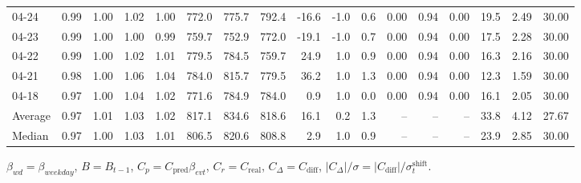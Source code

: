 \begin{threeparttable}
{\begin{tabular}{lrrrrrrrrrrrrrrrr}
  04-24 &         0.99 &           1.00 &          1.02 &          1.00 & 772.0 &  775.7 & 792.4 &      -16.6 &                     -1.0 &                 0.6 &       0.00 &      0.94 &           0.00 &             19.5 &            2.49 &                  30.00 \\
  04-23 &         0.99 &           1.00 &          1.00 &          0.99 & 759.7 &  752.9 & 772.0 &      -19.1 &                     -1.0 &                 0.7 &       0.00 &      0.94 &           0.00 &             17.5 &            2.28 &                  30.00 \\
  04-22 &         0.99 &           1.00 &          1.02 &          1.01 & 779.5 &  784.5 & 759.7 &       24.9 &                      1.0 &                 0.9 &       0.00 &      0.94 &           0.00 &             16.3 &            2.16 &                  30.00 \\
  04-21 &         0.98 &           1.00 &          1.06 &          1.04 & 784.0 &  815.7 & 779.5 &       36.2 &                      1.0 &                 1.3 &       0.00 &      0.94 &           0.00 &             12.3 &            1.59 &                  30.00 \\
  04-18 &         0.97 &           1.00 &          1.04 &          1.02 & 771.6 &  784.9 & 784.0 &        0.9 &                      1.0 &                 0.0 &       0.00 &      0.94 &           0.00 &             16.1 &            2.05 &                  30.00 \\
Average &         0.97 &           1.01 &          1.03 &          1.02 & 817.1 &  834.6 & 818.6 &       16.1 &                      0.2 &                 1.3 &         -- &        -- &             -- &             33.8 &            4.12 &                  27.67 \\
 Median &         0.97 &           1.00 &          1.03 &          1.01 & 806.5 &  820.6 & 808.8 &        2.9 &                      1.0 &                 0.9 &         -- &        -- &             -- &             23.9 &            2.85 &                  30.00 \\
\bottomrule
\end{tabular}
}
\begin{tablenotes}\footnotesize
\item $\beta_{wd}=\beta_{weekday}$, $B=B_{t-1}$,
$C_p=C_{\text{pred}}\beta_{evt}$, $C_r=C_{\text{real}}$,
$C_\Delta=C_{\text{diff}}$, $|C_\Delta|/\sigma=|C_{\text{diff}}|/\sigma_t^{\text{shift}}$.
\end{tablenotes}
\end{threeparttable}
\endgroup
